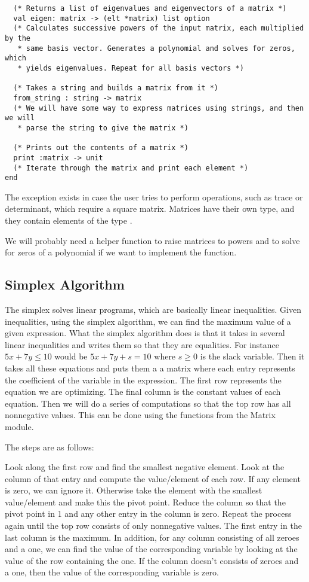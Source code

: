\documentclass[letterpaper,11pt]{article}
\begin{document}
\begin{verbatim}
  (* Returns a list of eigenvalues and eigenvectors of a matrix *)
  val eigen: matrix -> (elt *matrix) list option
  (* Calculates successive powers of the input matrix, each multiplied by the
   * same basis vector. Generates a polynomial and solves for zeros, which 
   * yields eigenvalues. Repeat for all basis vectors *)

  (* Takes a string and builds a matrix from it *)
  from_string : string -> matrix
  (* We will have some way to express matrices using strings, and then we will
   * parse the string to give the matrix *)
  
  (* Prints out the contents of a matrix *)   
  print :matrix -> unit
  (* Iterate through the matrix and print each element *)
end
\end{verbatim}

The exception exists in case the user tries to perform operations, such as trace
or determinant, which require a square matrix. Matrices have their own type, and
they contain elements of the type \verb@elt@. 

We will probably need a helper function to raise matrices to powers and to solve
for zeros of a polynomial if we want to implement the \verb@eigen@ function. 

\subsection{Simplex Algorithm}

The simplex solves linear programs, which are basically linear inequalities.
Given inequalities, using the simplex algorithm, we can find the maximum value
of a given expression. What the simplex algorithm does is that it takes in
several linear inequalities and writes them so that they are equalities. For
instance $5x + 7y \leq 10$ would be $5x + 7y + s = 10$ where $s \geq 0$ is the
slack variable. Then it takes all these equations and puts them a a matrix where
each entry represents the coefficient of the variable in the expression. The
first row represents the equation we are optimizing. The final column is the
constant values of each equation. Then we will do a series of computations so
that the top row has all nonnegative values. This can be done using the
functions from the Matrix module. 

The steps are as follows:

Look along the first row and find the smallest negative element. Look at the
column of that entry and compute the value/element of each row. If any element
is zero, we can ignore it. Otherwise take the element with the smallest
value/element and make this the pivot point. Reduce the column so that the pivot
point in 1 and any other entry in the column is zero. Repeat the process again
until the top row consists of only nonnegative values. The first entry in the
last column is the maximum. In addition, for any column consisting of all zeroes
and a one, we can find the value of the corresponding variable by looking at the
value of the row containing the one. If the column doesn't consists of zeroes
and a one, then the value of the corresponding variable is zero. 
\end{document}
